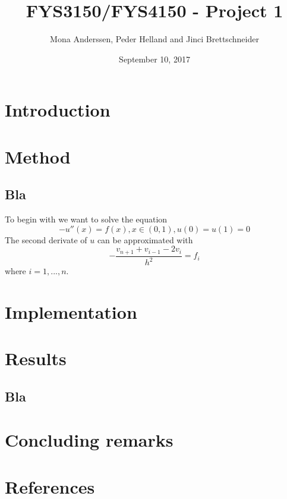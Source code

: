 \documentclass[a4paper,12pt,english]{article}
\title{FYS3150/FYS4150 - Project 1}
\author{Mona Anderssen, Peder Helland and Jinci Brettschneider}
\date{September 10, 2017}
\begin{document}
\maketitle
\abstract

\section{Introduction}

\section{Method}
\subsection{Bla}
To begin with we want to solve the equation
\begin{equation}
-u''(x) = f(x),   x \in (0, 1),   u(0) = u(1) = 0
\end{equation}
The second derivate of $u$ can be approximated with
\begin{equation}
-\frac{v_{n+1}+v_{i-1}-2v_i}{h^2} = f_i 
\end{equation}
where $i = 1,...,n$. 

\section{Implementation}

\section{Results}
\subsection{Bla}

\section{Concluding remarks}

\section{References}
\end{document}
